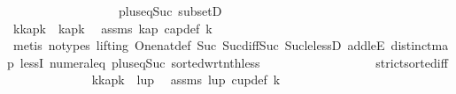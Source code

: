 \begin{isabellebody}
\ \ \ \ \ \ \ \ \ \ \ \ \ \ \ \ \ \ plus{\isacharunderscore}{\kern0pt}{}{\isacharunderscore}{\kern0pt}eq{\isacharunderscore}{\kern0pt}Suc\ subsetD{\isacharparenright}{\kern0pt}\isanewline
\ \ \ \ \ \ \ \ \ \ \ \ \isanewline
\ \ \ \ \ \ \ \ \ \ \ \ \isamarkupfalse%
\ k{}{\isacharcolon}{\kern0pt}{\isachardoublequoteopen}{\isacharparenleft}{\kern0pt}kap{\isacharbang}{\kern0pt}{\isacharparenleft}{\kern0pt}k{\isacharminus}{\kern0pt}{}{\isacharparenright}{\kern0pt}{\isacharparenright}{\kern0pt}\ {\isacharless}{\kern0pt}\ {\isacharparenleft}{\kern0pt}kap{\isacharbang}{\kern0pt}{\isacharparenleft}{\kern0pt}k{\isacharminus}{\kern0pt}{}{\isacharparenright}{\kern0pt}{\isacharparenright}{\kern0pt}{\isachardoublequoteclose}\ \isamarkupfalse%
\ assms\ kap\ cap{\isacharunderscore}{\kern0pt}def\ k{}{\isacharparenleft}{\kern0pt}{}{\isacharparenright}{\kern0pt}\isanewline
\ \ \ \ \ \ \ \ \ \ \ \ \ \ \isamarkupfalse%
\ {\isacharparenleft}{\kern0pt}metis\ {\isacharparenleft}{\kern0pt}no{\isacharunderscore}{\kern0pt}types{\isacharcomma}{\kern0pt}\ lifting{\isacharparenright}{\kern0pt}\ One{\isacharunderscore}{\kern0pt}nat{\isacharunderscore}{\kern0pt}def\ Suc{\isacharunderscore}{\kern0pt}{}\ Suc{\isacharunderscore}{\kern0pt}diff{\isacharunderscore}{\kern0pt}Suc\ Suc{\isacharunderscore}{\kern0pt}le{\isacharunderscore}{\kern0pt}lessD\ add{\isacharunderscore}{\kern0pt}leE\ distinct{\isacharunderscore}{\kern0pt}map\ lessI\ numeral{\isacharunderscore}{\kern0pt}{}{\isacharunderscore}{\kern0pt}eq{\isacharunderscore}{\kern0pt}{}\ plus{\isacharunderscore}{\kern0pt}{}{\isacharunderscore}{\kern0pt}eq{\isacharunderscore}{\kern0pt}Suc\ sorted{\isacharunderscore}{\kern0pt}wrt{\isacharunderscore}{\kern0pt}nth{\isacharunderscore}{\kern0pt}less\isanewline
\ \ \ \ \ \ \ \ \ \ \ \ \ \ \ \ \ \ strict{\isacharunderscore}{\kern0pt}sorted{\isacharunderscore}{\kern0pt}iff{\isacharparenright}{\kern0pt}\isanewline
\ \ \ \ \ \ \ \ \ \ \ \ \isamarkupfalse%
\ k{}{\isacharcolon}{\kern0pt}{\isachardoublequoteopen}{\isacharparenleft}{\kern0pt}kap{\isacharbang}{\kern0pt}{\isacharparenleft}{\kern0pt}k{\isacharminus}{\kern0pt}{}{\isacharparenright}{\kern0pt}{\isacharparenright}{\kern0pt}\ {\isacharless}{\kern0pt}\ {\isacharparenleft}{\kern0pt}lup{\isacharbang}{\kern0pt}{}{\isacharparenright}{\kern0pt}{\isachardoublequoteclose}\ \isamarkupfalse%
\ assms\ lup\ cup{\isacharunderscore}{\kern0pt}def\ k{}{\isacharparenleft}{\kern0pt}{}{\isacharparenright}{\kern0pt}\isanewline

\end{isabellebody}
